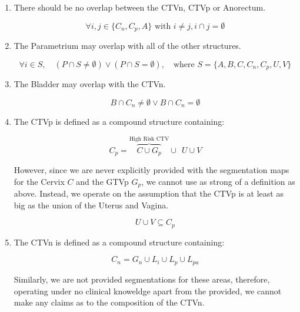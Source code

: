 \documentclass[11pt,twoside]{report}
\begin{document}
\begin{enumerate}
  \item There should be no overlap between the CTVn, CTVp or Anorectum.

        \begin{equation}\label{eq:ctvn-ctvp-anorectum}
          \forall{i,j \in \{C_n, C_p, A\}}\text{ with } i \neq j, i \cap j = \emptyset
        \end{equation}

  \item The Parametrium may overlap with all of the other structures.

        \begin{equation}\label{eq:parametrium}
          \forall i \in S, \quad (P \cap S \neq \emptyset) \vee (P \cap S = \emptyset), \quad \text{where } S = \{A, B, C, C_n, C_p, U, V\}
        \end{equation}

  \item The Bladder may overlap with the CTVn.

        \begin{equation}\label{eq:bladder-ctvn}
          B \cap C_n \neq \emptyset \vee B \cap C_n = \emptyset
        \end{equation}

  \item The CTVp is defined as a compound structure containing:

        \begin{equation}
          C_p = \overbrace{C \cup G_p}^{\text{High Risk CTV}} \cup \ \ U \cup V\label{eq:ctvp1}
        \end{equation}

  However, since we are never explicitly provided with the segmentation maps for the Cervix $C$ and the GTVp $G_p$, we cannot use as strong of a definition as above. Instead, we operate on the assumption that the CTVp is at least as big as the union of the Uterus and Vagina.

        \begin{equation}
          U \cup V \subseteq C_p\label{eq:ctvp2}
        \end{equation}

  \item The CTVn is defined as a compound structure containing:

        \begin{equation}\label{eq:ctvn-lymph}
          C_n = G_n \cup L_i \cup L_p \cup L_{pa}
        \end{equation}

  Similarly, we are not provided segmentations for these areas, therefore, operating under no clinical knoweldge apart from the provided, we cannot make any claims as to the composition of the CTVn.

\end{enumerate}
\end{document}

